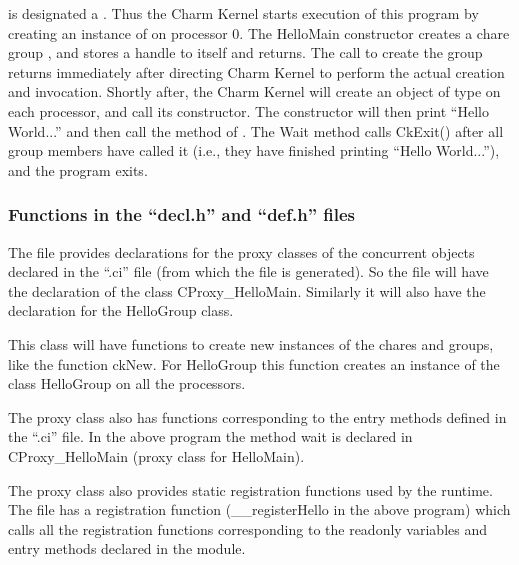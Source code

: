  is designated a . Thus the Charm Kernel starts 
execution of this program by creating an instance of  on 
processor 0. The HelloMain constructor creates a chare group ,
 and stores a handle to itself and returns. The call to create the 
group returns immediately after directing Charm Kernel to perform 
the actual creation and invocation. 
Shortly after, the Charm Kernel will create an object of type
 on each processor, and call its constructor. The constructor 
will then print 
``Hello World...'' and then call the  method 
of . The Wait method calls CkExit() after all group members have called it (i.e., they have finished printing ``Hello World...''), and the \charmpp program exits.

\subsubsection{Functions in the ``decl.h'' and ``def.h'' files}

	The  file provides declarations for the proxy classes of the concurrent objects declared in the ``.ci'' file (from which the  file is generated). So the  file will have the declaration of the class CProxy\_HelloMain. Similarly it will also have the declaration for the HelloGroup class. 

	This class will have functions to create new instances of the chares and groups, like the function ckNew. For HelloGroup this function creates an instance of the class HelloGroup on all the processors. 

	The proxy class also has functions corresponding to the entry methods defined in the ``.ci'' file. In the above program the method wait is declared in CProxy\_HelloMain (proxy class for HelloMain).

	The proxy class also provides static registration functions used by the \charmpp runtime.  The  file has a registration function (\_\_registerHello in the above program) which calls all the registration functions corresponding to the readonly variables and entry methods declared in the module.


	






